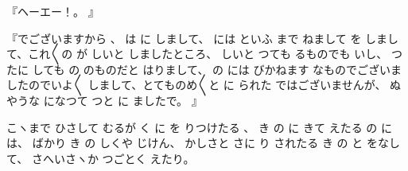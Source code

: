 『ヘーエー！。
』

『でございますから
、
は
に
しまして、
には
といふ
まで
ねまして
を
しまして、これ〳〵の
が
しいと
しましたところ、
しいと
つても
るものでも
いし、
つたに
しても
の
のものだと
はりまして、
の
には
びかねます
なものでございましたのでいよ〳〵
しまして、とてものめ〳〵と
に
られた
ではございませんが、
ぬやうな
になつて
つと
に
ましたで。
』

こヽまで
ひさして
むるが
く
に
を
りつけたる
、
き
の
に
きて
えたる
の
には、
ばかり
き
の
しくや
じけん、
かしさと
さに
り
されたる
き
の
と
をなして、
さへいさヽか
つごとく
えたり。

